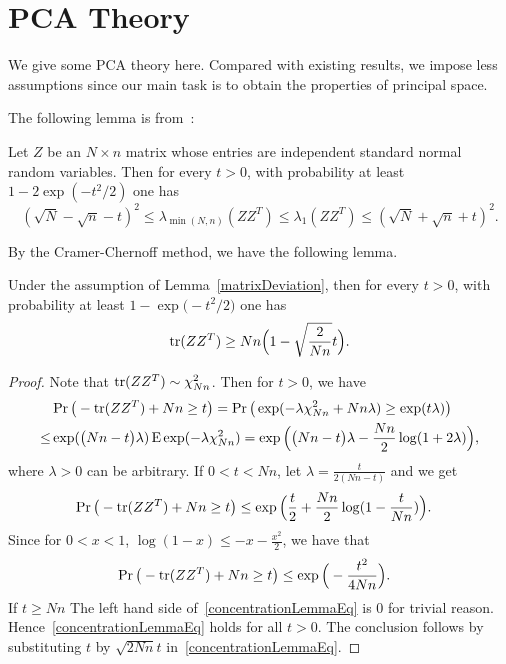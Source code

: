 \section{PCA Theory}

We give some PCA theory here.
Compared with existing results, we impose less assumptions since our main task is to obtain the properties of principal space.

The following lemma is from~\cite{Davidson2001Local}:
\begin{lemma}\label{matrixDeviation}
    Let $Z$ be an $N\times n$ matrix whose entries are independent standard normal random variables.
    Then for every $t> 0$, with probability at least $1-2\exp (-t^2/2)$ one has
    $$
    (\sqrt{N}-\sqrt{n}-t)^2 \leq \lambda_{\min(N,n)}(ZZ^T)\leq \lambda_{1}(ZZ^T)\leq (\sqrt{N}+\sqrt{n}+t)^2.
    $$
\end{lemma}
By the Cramer-Chernoff method, we have the following lemma.
\begin{lemma}\label{PCAlemma1}
    Under the assumption of Lemma~\ref{matrixDeviation}, then for every $t> 0$, with probability at least $1-\exp\big(-{t^2}/{2}\big)$ one has
    $$
    \operatorname{tr}(ZZ^T)\geq Nn\Big(1-\sqrt{\frac{2}{Nn}}t\Big).
    $$
\end{lemma}
\begin{proof}
    Note that $\operatorname{tr}(ZZ^T)\sim \chi^2_{Nn}$. Then for $t>0$, we have
\begin{equation*}
    \begin{split}
        &\Pr\big(-\operatorname{tr} (ZZ^T)+ Nn \geq t\big)
        = 
        \Pr\big(\exp(-\lambda\chi^2_{Nn}+  Nn\lambda) \geq \exp (t\lambda)\big)\\
        \leq &
        \exp(\big(Nn-t\big)\lambda) \operatorname{E} \exp(-\lambda \chi^2_{Nn})
        =
        \exp\Big(\big(Nn-t\big)\lambda -\frac{Nn}{2}\log(1+2\lambda)\Big),
    \end{split}
\end{equation*}
    where $\lambda>0$ can be arbitrary.
    If $0<t< Nn$, let $\lambda=\frac{t}{2(Nn-t)}$ and we get
\begin{equation*}
    \begin{split}
        &\Pr\big(-\operatorname{tr} (ZZ^T)+ Nn \geq t\big)
        \leq
        \exp\Big(\frac{t}{2}+\frac{Nn}{2}\log(1-\frac{t}{Nn})\Big).
    \end{split}
\end{equation*}
    Since for $0<x<1$, $\log(1-x)\leq -x-\frac{x^2}{2}$, we have that
    \begin{equation}\label{concentrationLemmaEq}
    \begin{split}
        &\Pr\big(-\operatorname{tr} (ZZ^T)+ Nn \geq t\big)
        \leq
        \exp\Big(-\frac{t^2}{4Nn}\Big).
    \end{split}
\end{equation}
    If $t\geq Nn$ The left hand side of~\eqref{concentrationLemmaEq} is $0$ for trivial reason.
    Hence~\eqref{concentrationLemmaEq} holds for all $t>0$.
    The conclusion follows by substituting $t$ by $\sqrt{2Nn}t$ in~\eqref{concentrationLemmaEq}.
\end{proof}
